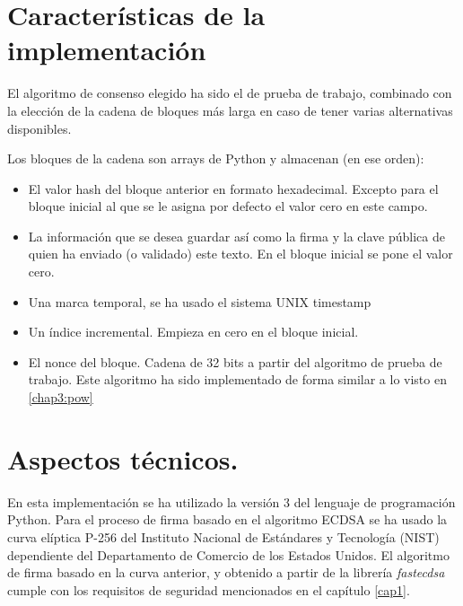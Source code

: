 \section{Características de la implementación}
El algoritmo de consenso elegido ha sido el de prueba de trabajo, combinado con la elección de la cadena de bloques más larga en caso de tener varias alternativas disponibles.

Los bloques de la cadena son arrays de Python y almacenan (en ese orden):
\begin{itemize}
\item El valor hash del bloque anterior en formato hexadecimal. Excepto para el bloque inicial al que se le asigna por defecto el valor cero en este campo.
\item La información que se desea guardar así como la firma y la clave pública de quien ha enviado (o validado) este texto. En el bloque inicial se pone el valor cero.
\item Una marca temporal, se ha usado el sistema UNIX timestamp
\item Un índice incremental. Empieza en cero en el bloque inicial.  
\item El nonce del bloque. Cadena de 32 bits a partir del algoritmo de prueba de trabajo. Este algoritmo ha sido implementado de forma similar a lo visto en \ref{chap3:pow}
\end{itemize}



\section{Aspectos técnicos.}
En esta implementación se ha utilizado la versión 3 del lenguaje de programación Python. Para el proceso de firma basado en el algoritmo ECDSA se ha usado la curva elíptica P-256 del Instituto Nacional de Estándares y Tecnología (NIST) dependiente del Departamento de Comercio de los Estados Unidos. El algoritmo de firma basado en la curva anterior, y obtenido a partir de la librería \textit{fastecdsa} cumple con los requisitos de seguridad mencionados en el capítulo \ref{cap1}.

